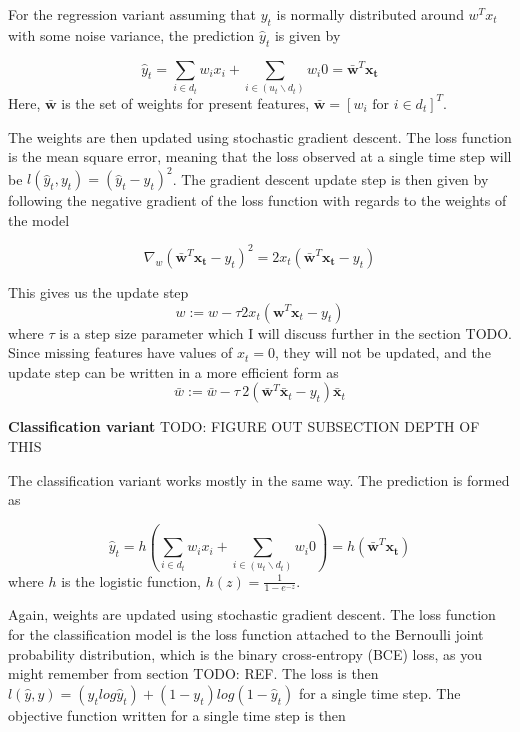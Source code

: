 For the regression variant assuming that $y_t$ is normally distributed around
$w^T x_t$ with some noise variance, the prediction $\hat y_t$ is given by

\begin{equation}
  \hat y_t = \sum_{i \in d_t} w_i x_i + \sum_{i \in (u_t \backslash d_t)} w_i 0 = \bar{\mathbf{w}}^T \mathbf {x_t}
\end{equation}
Here, $\bar{\mathbf{w}}$ is the set of weights for present features,
$\bar{\mathbf{w}} = [w_i \text{ for } i \in d_t]^T$.

The weights are then updated using stochastic gradient descent. The loss
function is the mean square error, meaning that the loss observed at a single
time step will be $l(\hat y_t, y_t) = (\hat y_t - y_t)^2$. The gradient descent
update step is then given by following the negative gradient of the loss
function with regards to the weights of the model

\begin{equation}
  \nabla_w ( \bar{\mathbf{w}}^T \mathbf {x_t} - y_t)^2 = 2 x_t(\bar{\mathbf{w}}^T \mathbf {x_t} - y_t)
\end{equation}

This gives us the update step
\begin{equation}
  w := w - \tau 2 x_t(\mathbf{w}^T \mathbf {x}_t - y_t)
\end{equation}
where $\tau$ is a step size parameter which I will discuss further in the
section TODO. Since missing features have values of $x_t=0$, they will not be
updated, and the update step can be written in a more efficient form as
\begin{equation}
  \bar w := \bar w - \tau \, 2 (\bar {\mathbf{w}}^T \bar {\mathbf {x}}_t - y_t) \bar {\mathbf{x}}_t
\end{equation}

\textbf{Classification variant} TODO: FIGURE OUT SUBSECTION DEPTH OF THIS

The classification variant works mostly in the same way. The prediction is
formed as

\begin{equation}
  \hat y_t = h(\sum_{i \in d_t} w_i x_i + \sum_{i \in (u_t \backslash d_t)} w_i 0) = h(\bar{\mathbf{w}}^T \mathbf {x_t})
\end{equation}
where $h$ is the logistic function, $h(z)=\frac{1}{1-e^{-z}}$.

Again, weights are updated using stochastic gradient descent. The loss function
for the classification model is the loss function attached to the Bernoulli
joint probability distribution, which is the binary cross-entropy (BCE) loss,
as you might remember from section TODO: REF. The loss is then $l(\hat y,y) =
(y_t log \hat y_t) + (1-y_t) log(1 - \hat y_t)$ for a single time step. The
objective function written for a single time step is then

